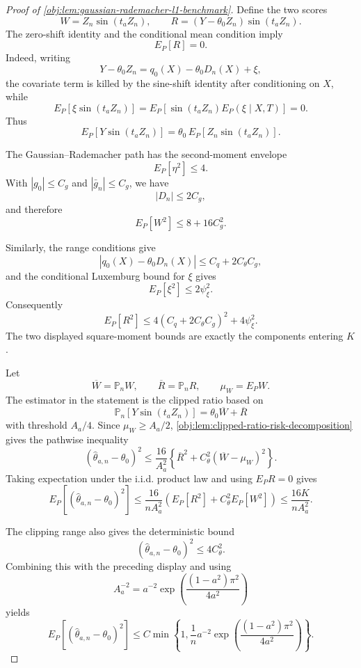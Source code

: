 \documentclass[11pt]{article}
\begin{document}
\begin{proof}[Proof of \cref{obj:lem:gaussian-rademacher-l1-benchmark}]
Define the two scores
\[
W=Z_n\sin(t_aZ_n),
\qquad
R=(Y-\theta_0Z_n)\sin(t_aZ_n).
\]
The zero-shift identity and the conditional mean condition imply
\[
E_P[R]=0.
\]
Indeed, writing
\[
Y-\theta_0Z_n
=
q_0(X)-\theta_0D_n(X)+\xi,
\]
the covariate term is killed by the sine-shift identity after conditioning on \(X\), while
\[
E_P[\xi\sin(t_aZ_n)]
=
E_P\!\left[\sin(t_aZ_n)E_P(\xi\mid X,T)\right]
=
0 .
\]
Thus
\[
E_P[Y\sin(t_aZ_n)]
=
\theta_0\,E_P[Z_n\sin(t_aZ_n)] .
\]

The Gaussian--Rademacher path has the second-moment envelope
\[
E_P[\eta^2]\le4.
\]
With \(|g_0|\le C_g\) and \(|\bar g_n|\le C_g\), we have
\[
|D_n|\le2C_g,
\]
and therefore
\[
E_P[W^2]\le 8+16C_g^2.
\]

Similarly, the range conditions give
\[
|q_0(X)-\theta_0D_n(X)|
\le
C_q+2C_\theta C_g,
\]
and the conditional Luxemburg bound for \(\xi\) gives
\[
E_P[\xi^2]\le 2\psi_\xi^2.
\]
Consequently
\[
E_P[R^2]
\le
4(C_q+2C_\theta C_g)^2+4\psi_\xi^2.
\]
The two displayed square-moment bounds are exactly the components entering \(K\). %

Let
\[
\overline W=\mathbb P_n W,
\qquad
\overline R=\mathbb P_n R,
\qquad
\mu_W=E_PW .
\]
The estimator in the statement is the clipped ratio based on
\[
\mathbb P_n[Y\sin(t_aZ_n)]
=
\theta_0\overline W+\overline R
\]
with threshold \(A_a/4\).  Since \(\mu_W\ge A_a/2\), \cref{obj:lem:clipped-ratio-risk-decomposition} gives the pathwise inequality
\[
(\widehat\theta_{a,n}-\theta_0)^2
\le
\frac{16}{A_a^2}
\left\{\overline R^2+C_\theta^2(\overline W-\mu_W)^2\right\}.
\]
Taking expectation under the i.i.d. product law and using \(E_PR=0\) gives
\[
E_P[(\widehat\theta_{a,n}-\theta_0)^2]
\le
\frac{16}{nA_a^2}
\left(E_P[R^2]+C_\theta^2E_P[W^2]\right)
\le
\frac{16K}{nA_a^2}.
\]

The clipping range also gives the deterministic bound
\[
(\widehat\theta_{a,n}-\theta_0)^2\le4C_\theta^2 .
\]
Combining this with the preceding display and using
\[
A_a^{-2}
=
a^{-2}
\exp\!\left(\frac{(1-a^2)\pi^2}{4a^2}\right)
\]
yields
\[
E_P[(\widehat\theta_{a,n}-\theta_0)^2]
\le
C\min\!\left\{
1,\frac1n a^{-2}
\exp\!\left(\frac{(1-a^2)\pi^2}{4a^2}\right)
\right\}.
\]


\end{proof}
\end{document}
